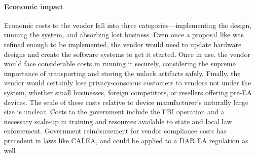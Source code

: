 \paragraph*{Economic impact} Economic costs to the vendor fall into three categories---implementing the design, running
the system, and absorbing lost business. Even once a proposal like \ldawmsr was refined enough to be implemented, the
vendor would need to update hardware designs and create the software systems to get it started. Once in use, the vendor
would face considerable costs in running it securely, considering the supreme importance of transporting and storing the
unlock artifacts safely. Finally, the vendor would certainly lose privacy-conscious customers to vendors not under the
system, whether small businesses, foreign competitors, or resellers offering pre-\ac{EA} devices. The scale of these
costs relative to device manufacturer's naturally large size is unclear. Costs to the government include the \ac{FBI}
operation and a necessary scale-up in training and resources available to state and local law enforcement. Government
reimbursement for vendor compliance costs has precedent in laws like \acs{CALEA}, and could be applied to a \ac{DAR}
\ac{EA} regulation as well \cite{edwards_hr4922_1994}.
